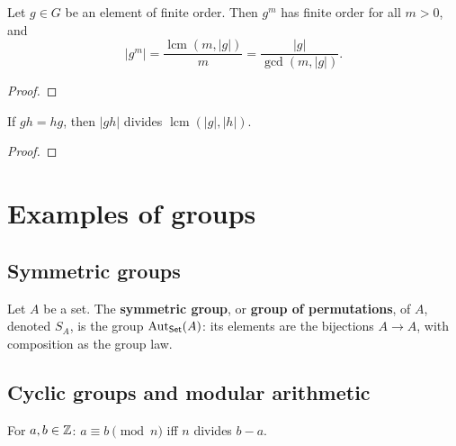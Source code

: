 \begin{proposition}[II.1.7]
  \label{prop:groups:order-power}
  \leanok
  Let $g \in G$ be an element of finite order. Then $g^m$ has finite
  order for all $m > 0$, and
  \[
    |g^m| = \frac{\operatorname{lcm}(m,|g|)}{m} =
    \frac{|g|}{\gcd(m,|g|)}.
  \]
\end{proposition}
\begin{proof}
  \leanok
\end{proof}

\begin{proposition}[II.1.8]
  \label{prop:groups:order-product}
  \leanok
  If $gh = hg$, then $|gh|$ divides $\operatorname{lcm}(|g|,|h|)$.
\end{proposition}
\begin{proof}
  \leanok
\end{proof}

\section{Examples of groups}
\label{sec:groups:examples-of-groups}

\subsection{Symmetric groups}
\label{subsec:groups:symmetric-groups}

\begin{definition}
  \label{def:groups:symmetric-group}
  Let $A$ be a set. The \textbf{symmetric group}, or \textbf{group of
    permutations}, of $A$, denoted $S_A$, is the group
  $\operatorname{Aut}_{\mathsf{Set}}(A)$: its elements are the bijections
  $A \to A$, with composition as the group law.
\end{definition}

\subsection{Cyclic groups and modular arithmetic}
\label{subsec:groups:cyclic-groups-and-modular-arithmetic}

\begin{definition}
  \label{def:groups:cong-mod}
  \leanok
  For $a, b \in \mathbb{Z}$: $a \equiv b \pmod{n}$ iff $n$ divides $b - a$.
\end{definition}

